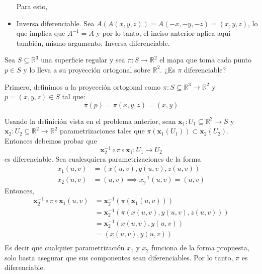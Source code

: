 \begin{problema}
\begin{dem}
\begin{itemize}
            Para esto, 
            \item Inversa diferenciable. Sea $A(A(x,y,z))=A(-x,-y,-z)=(x,y,z)$, lo que implica que $A^{-1}=A$ y por lo tanto, el inciso anterior aplica aqui también, mismo argumento. Inversa diferenciable. 

            
        \end{itemize}
    \end{dem}
    
\end{problema}

\begin{problema}
    Sea $S \subseteq \mathbb{R}^3$ una superficie regular y sea $\pi: S \rightarrow \mathbb{R}^2$ el mapa que toma cada punto $p \in S$ y lo lleva a su proyección ortogonal sobre $\mathbb{R}^2$. ¿Es $\pi$ diferenciable?
    \begin{sol}
        Primero, definimos a la proyección ortogonal como $\pi:S\subseteq\mathbb{R}^3\to \mathbb{R}^2$ y $p=(x,y,z)\in S$ tal que: 
        $$\pi(p)=\pi(x,y,z)=(x,y)$$

        Usando la definición vista en el problema anterior, sean $\mathbf{x}_1:U_1\subseteq \mathbb{R}^2\to S$ y $\mathbf{x}_2:U_2\subseteq\mathbb{R}^2\to \mathbb{R}^2$ parametrizaciones tales que $\pi(\mathbf{x}_1(U_1))\subset \mathbf{x}_2(U_2)$. Entonces debemos probar que $$ \mathbf{x}_2^{-1}\circ \pi \circ \mathbf{x}_1:U_1\to U_2 $$ es diferenciable. Sea cualesquiera parametrizaciones de la forma
        \begin{align*}
            x_1(u,v) &= (x(u,v),y(u,v),z(u,v))\\
            x_2(u,v) &= (u,v) \implies x_2^{-1}(u,v) = (u,v)
        \end{align*}
        Entonces, 
        \begin{align*}
            \mathbf{x}_2^{-1}\circ \pi \circ \mathbf{x}_1(u,v) &=  \mathbf{x}_2^{-1}(\pi (\mathbf{x}_1(u,v)))\\
            &= \mathbf{x}_2^{-1}(\pi (x(u,v),y(u,v),z(u,v)))\\
            &= \mathbf{x}_2^{-1}(x(u,v),y(u,v))\\
            &=(x(u,v),y(u,v))\\
        \end{align*}
        Es decir que cualquier parametrización $x_1$ y $x_2$ funciona de la forma propuesta, solo basta asegurar que sus componentes sean diferenciables. Por lo tanto, $\pi$ es diferenciable. 
    \end{sol}
\end{problema}

